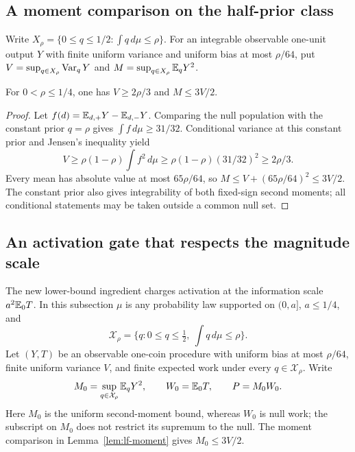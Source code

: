\subsection{A moment comparison on the half-prior class}

Write $X_\rho=\{0\le q\le1/2:\int q\,d\mu\le\rho\}$.
For an integrable observable one-unit output $Y$ with finite uniform
variance and uniform bias at most $\rho/64$, put $V=\sup_{q\in X_\rho}\operatorname{Var}_qY$ and
$M=\sup_{q\in X_\rho}\mathbb E_qY^2$.

\begin{lemma}\label{lem:lf-moment}
For $0<\rho\le1/4$, one has $V\ge2\rho/3$ and $M\le3V/2$.
\end{lemma}
\begin{proof}
Let $f(d)=\mathbb E_{d,+}Y-\mathbb E_{d,-}Y$. Comparing the null population with
the constant prior $q=\rho$ gives $\int f\,d\mu\ge31/32$.
Conditional variance at this constant prior and Jensen's inequality yield
\[
 V\ge\rho(1-\rho)\int f^2\,d\mu
 \ge\rho(1-\rho)(31/32)^2\ge2\rho/3.
\]
Every mean has absolute value at most $65\rho/64$, so
$M\le V+(65\rho/64)^2\le3V/2$.
The constant prior also gives integrability of both fixed-sign second
moments; all conditional statements may be taken outside a common null set.
\end{proof}

\subsection{An activation gate that respects the magnitude scale}

The new lower-bound ingredient charges activation at the information
scale \(a^2\mathbb E_0T\).  In this subsection \(\mu\) is any probability law
supported on \((0,a]\), \(a\le1/4\), and
\[
 \mathcal X_\rho=
 \{q:0\le q\le\tfrac12,\ \textstyle\int q\,d\mu\le\rho\}.
\]
Let \((Y,T)\) be an observable one-coin procedure with uniform bias at
most \(\rho/64\), finite uniform variance \(V\), and finite expected work
under every \(q\in\mathcal X_\rho\).  Write
\[
 M_0=\sup_{q\in\mathcal X_\rho}\mathbb E_qY^2,\qquad
 W_0=\mathbb E_0T,\qquad P=M_0W_0.
\]
Here $M_0$ is the uniform second-moment bound, whereas $W_0$ is
null work; the subscript on $M_0$ does not restrict its supremum to the null.
The moment comparison in Lemma~\ref{lem:lf-moment} gives
\(M_0\le3V/2\).

